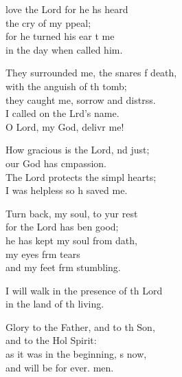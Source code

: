 \settowidth{\versewidth}{They surrounded me, the snares of death, *}
\begin{psalmverse}%
  \begin{patverse}
 love the Lord for he hs heard\Med\\
the cry of my ppeal;\\
for he turned his ear t me\Med\\
in the day when  called him.

They surrounded me, the snares f death,\Med\\
with the anguish of th tomb;\\
they caught me, sorrow and distrss.\Flex\\
I called on the Lrd’s name.\Med\\
O Lord, my God, delivr me!

How gracious is the Lord, nd just;\Med\\
our God has cmpassion.\\
The Lord protects the simpl hearts;\Med\\
I was helpless so h saved me.

Turn back, my soul, to yur rest\Med\\
for the Lord has ben good;\\
he has kept my soul from dath,\Flex\\
my eyes frm tears\Med\\
and my feet frm stumbling.

I will walk in the presence of th Lord\Med\\
in the land of th living.

Glory to the Father, and to th Son,\Med\\
and to the Hol Spirit:\\
as it was in the beginning, \pointup{\i}s now,\Med\\
and will be for ever. men.
  \end{patverse}
\end{psalmverse}
